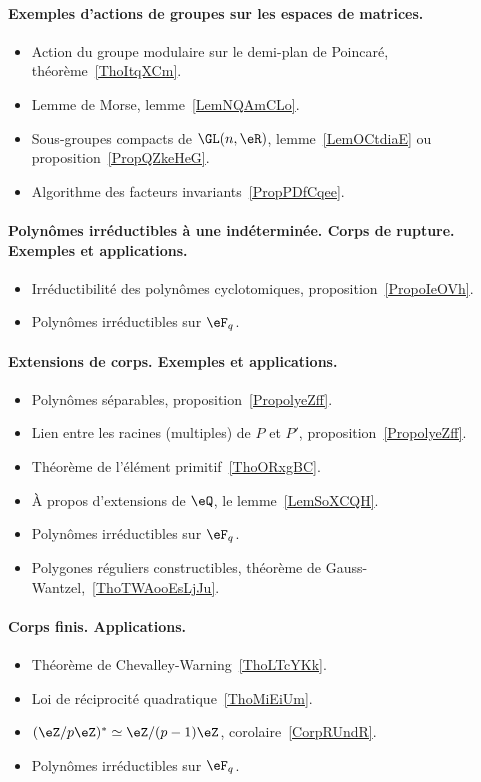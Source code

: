\paragraph{Exemples d'actions de groupes sur les espaces de matrices.}
\begin{itemize}
    \item Action du groupe modulaire sur le demi-plan de Poincaré, théorème~\ref{ThoItqXCm}.
    \item Lemme de Morse, lemme~\ref{LemNQAmCLo}.
    \item Sous-groupes compacts de \( \GL(n,\eR)\), lemme~\ref{LemOCtdiaE} ou proposition~\ref{PropQZkeHeG}.
    \item Algorithme des facteurs invariants~\ref{PropPDfCqee}.
\end{itemize}
\paragraph{Polynômes irréductibles à une indéterminée. Corps de rupture. Exemples et applications.}
\begin{itemize}
    \item Irréductibilité des polynômes cyclotomiques, proposition~\ref{PropoIeOVh}.
    \item Polynômes irréductibles sur \( \eF_q\).
\end{itemize}
\paragraph{Extensions de corps. Exemples et applications.}
\begin{itemize}
    \item Polynômes séparables, proposition~\ref{PropolyeZff}.
    \item Lien entre les racines (multiples) de \( P\) et \( P'\), proposition~\ref{PropolyeZff}.
    \item Théorème de l'élément primitif~\ref{ThoORxgBC}.
    \item À propos d'extensions de \( \eQ\), le lemme~\ref{LemSoXCQH}.
    \item Polynômes irréductibles sur \( \eF_q\).
    \item Polygones réguliers constructibles, théorème de Gauss-Wantzel,~\ref{ThoTWAooEsLjJu}.
\end{itemize}
\paragraph{Corps finis. Applications.}
\begin{itemize}
    \item Théorème de Chevalley-Warning~\ref{ThoLTcYKk}.
    \item Loi de réciprocité quadratique~\ref{ThoMiEiUm}.
    \item \( (\eZ/p\eZ)^*\simeq \eZ/(p-1)\eZ\), corolaire~\ref{CorpRUndR}.
    \item Polynômes irréductibles sur \( \eF_q\).
\end{itemize}

